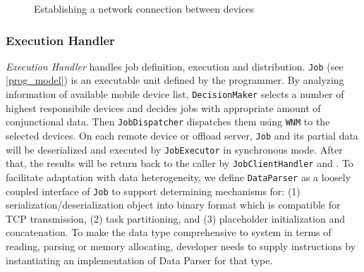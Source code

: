 \documentclass{sig-alternate}[10pt]
\begin{document}
\begin{CCSXML}
\begin{figure} 
	\centering
	\caption{Establishing a network connection between devices}
	\label{fig:forming}
\end{figure}


\subsubsection{Execution Handler}
\emph{Execution Handler} handles job definition, execution and distribution. \texttt{Job} (see \ref{prog_model}) is an executable unit defined by the programmer. By analyzing information of available mobile device list, \texttt{DecisionMaker} selects a number of highest responsibile devices and decides jobs with appropriate amount of conjunctional data. Then \texttt{JobDispatcher} dispatches them using \texttt{WNM} to the selected devices. On each remote device or offload server, \texttt{Job} and its partial data will be deserialized and executed by \texttt{JobExecutor} in synchronous mode. After that, the results will be return back to the caller by \texttt{JobClientHandler} and . To facilitate adaptation with data heterogeneity, we define \texttt{DataParser} as a loosely coupled interface of \texttt{Job} to support determining mechanisms for: (1) serialization/deserialization object into binary format which is compatible for TCP transmission, (2) task partitioning, and (3) placeholder initialization and concatenation. To make the data type comprehensive to system in terms of reading, parsing or memory allocating, developer needs to supply instructions by instantiating an implementation of Data Parser for that type. 



\end{CCSXML}
\end{document}
